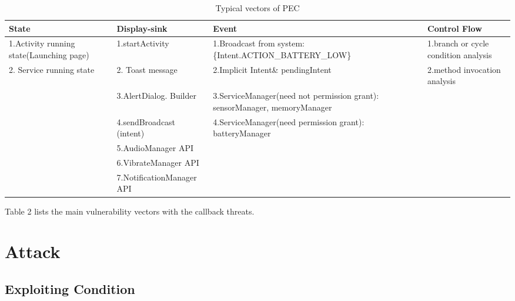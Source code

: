 \documentclass{sig-alternate-05-2015}
\begin{document}
%
%



\begin{table}[htbp]
\centering
 \caption{\label{tab:test} Typical vectors of PEC}
 \begin{tabularx}{\linewidth}{XXXX}

  \toprule
  State & Display-sink & Event & Control Flow \\
  \midrule
 1.Activity running state(Launching page) & 1.startActivity & 1.Broadcast from system: \{Intent.ACTION\_BATTERY\_LOW\} & 1.branch or cycle condition analysis \\
  2. Service running state &2. Toast message & 2.Implicit Intent\& pendingIntent & 2.method invocation analysis\\
     & 3.AlertDialog. Builder & 3.ServiceManager(need not permission grant): { sensorManager, memoryManager }\\
     & 4.sendBroadcast (intent)& 4.ServiceManager(need permission grant): { batteryManager }\\     
     & 5.AudioManager API & \\
     & 6.VibrateManager API & \\
     & 7.NotificationManager API & \\
     
  \bottomrule
 \end{tabularx}
\end{table}



{\color{red}Table 2} lists the main vulnerability vectors with the callback threats. 

\section{Attack}

\subsection{Exploiting Condition}
\end{document}
